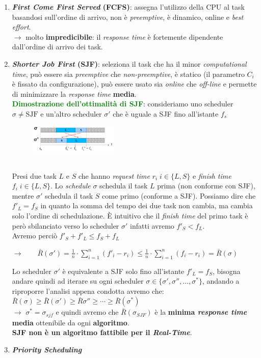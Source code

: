 \begin{enumerate}

    \item \textbf{\textit{First Come First Served} (FCFS)}: assegna l'utilizzo della CPU al task basandosi sull'ordine di arrivo, non è \textit{preemptive}, è dinamico, online e \textit{best effort}. \\
    $\rightarrow$ molto \textbf{impredicibile}: il \textit{response time} è fortemente dipendente dall'ordine di arrivo dei task.

    \item \textbf{\textit{Shorter Job First} (SJF)}: seleziona il task che ha il minor \textit{computational time}, può essere sia \textit{preemptive} che \textit{non-preemptive}, è statico (il parametro $C_i$ è fissato da configurazione), può essere usato sia \textit{online} che \textit{off-line} e permette di minimizzare la \textit{response time} \textbf{media}. \\
    \textcolor{green}{\textbf{Dimostrazione dell'ottimalità di SJF}}: consideriamo uno scheduler $\sigma \neq \text{SJF}$ e un'altro scheduler $\sigma'$ che è uguale a SJF fino all'istante $f_s$
    \begin{figure}[h]
        \centering
        \includegraphics[width=0.4\textwidth]{img/sjf_opt}    
    \end{figure}
    \\ 
    Presi due task $L$ e $S$ che hanno \textit{request time} $r_i \; i \in \{L, S\}$ e \textit{finish time} $f_i \; i \in \{L, S\}$. Lo \textit{schedule} $\sigma$ schedula il task $L$ prima (non conforme con SJF), mentre $\sigma'$ schedula il task $S$ come primo (conforme a SJF). Possiamo dire che $f'_L = f_S$ in quanto la somma del tempo dei due task non cambia, ma cambia solo l'ordine di schedulazione. È intuitivo che il \textit{finish time} del primo task è però sbilanciato verso lo scheduler $\sigma'$ infatti avremo $f'_S < f_L$. \\
    Avremo perciò $f'_S + f'_L \leq f_S + f_L$ 
    \begin{center}
        $\rightarrow \qquad \bar{R}(\sigma') = \frac{1}{n} \cdot \sum_{i = 1}^{n}{(f'_i - r_i)} \leq \frac{1}{n} \cdot \sum_{i = 1}^{n}{(f_i - r_i)} = \bar{R}(\sigma)$
    \end{center}
    Lo scheduler $\sigma'$ è equivalente a SJF solo fino all'istante $f'_L = f_S$, bisogna andare quindi ad iterare su ogni scheduler $\sigma \in \{\sigma', \sigma'', ..., \sigma^*\}$, andando a riproporre l'analisi appena condotta avremo che: $\bar{R}(\sigma) \geq \bar{R}(\sigma') \geq \bar{R}{\sigma''} \geq \cdots \geq \bar{R}(\sigma^*)$ \\
    $\rightarrow$ $\sigma^* = \sigma_{sjf}$ e quindi avremo che $\bar{R}(\sigma_{SJF})$ è la \textbf{minima \textit{response time} media} ottenibile da ogni \textbf{algoritmo}. \\
    \textbf{SJF non è un algoritmo fattibile per il \textit{Real-Time}}.

    \item \textbf{\textit{Priority Scheduling}}
\end{enumerate}